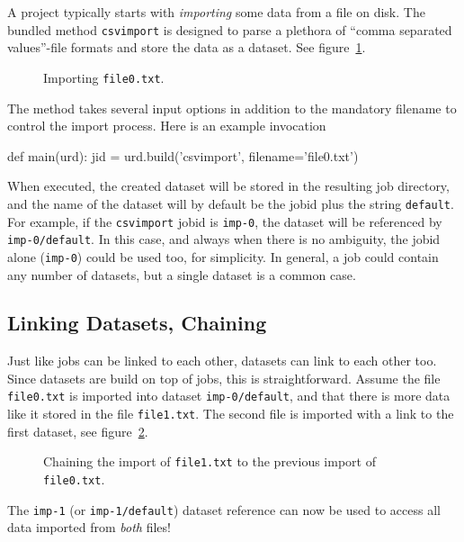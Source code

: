 A project typically starts with \textsl{importing} some data from a
file on disk.  The bundled method \texttt{csvimport} is designed to
parse a plethora of ``comma separated values''-file formats and store
the data as a dataset.  See figure~\ref{fig:dataset_csvimport}.
\begin{figure}[b]
  \begin{center}
    
    \caption{Importing \texttt{file0.txt}.}
    \label{fig:dataset_csvimport}
  \end{center}
\end{figure}
The method takes several input options in addition to the mandatory
filename to control the import process.  Here is an example
invocation
\begin{python}
def main(urd):
    jid = urd.build('csvimport', filename='file0.txt')
\end{python}
When executed, the created dataset will be stored in the resulting job
directory, and the name of the dataset will by default be the jobid
plus the string \texttt{default}.  For example, if the
\texttt{csvimport} jobid is \texttt{imp-0}, the dataset will be
referenced by \texttt{imp-0/default}.  In this case, and always when
there is no ambiguity, the jobid alone (\texttt{imp-0}) could be used
too, for simplicity.  In general, a job could contain any number of
datasets, but a single dataset is a common case.




\subsection{Linking Datasets, Chaining}

Just like jobs can be linked to each other, datasets can link to each
other too.  Since datasets are build on top of jobs, this is
straightforward.  Assume the file \texttt{file0.txt} is imported into
dataset \texttt{imp-0/default}, and that there is more data like it
stored in the file \texttt{file1.txt}.  The second file is imported
with a link to the first dataset, see
figure~\ref{fig:dataset_csvimport_chain}.
\begin{figure}[t]
  \begin{center}
    
    \caption{Chaining the import of \texttt{file1.txt} to the previous
      import of \texttt{file0.txt}.}
    \label{fig:dataset_csvimport_chain}
  \end{center}
\end{figure}
The \texttt{imp-1} (or \texttt{imp-1/default}) dataset reference can
now be used to access all data imported from \textsl{both} files!

